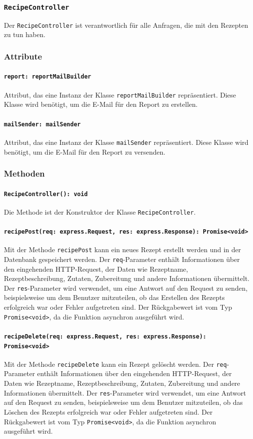 \documentclass{entwurfsheft}
\begin{document}
\subsubsection{\texttt{RecipeController}}\label{sec:RecipeController}
Der \texttt{RecipeController} ist verantwortlich für alle Anfragen, die mit den Rezepten zu tun haben.
\subsubsection*{Attribute}
\paragraph{\texttt{report: reportMailBuilder}}
Attribut, das eine Instanz der Klasse \texttt{reportMailBuilder} repräsentiert. Diese Klasse wird benötigt, um die E-Mail für den Report zu erstellen.
\paragraph{\texttt{mailSender: mailSender}}
Attribut, das eine Instanz der Klasse \texttt{mailSender} repräsentiert. Diese Klasse wird benötigt, um die E-Mail für den Report zu versenden.
\subsubsection*{Methoden}
\paragraph{\texttt{RecipeController(): void}}
Die Methode ist der Konstruktor der Klasse \texttt{RecipeController}.
\paragraph{\texttt{recipePost(req: express.Request, res: express.Response): Promise<void>}}
Mit der Methode \texttt{recipePost} kann ein neues Rezept erstellt werden und in der Datenbank gespeichert werden. Der \texttt{req}-Parameter enthält Informationen über den eingehenden HTTP-Request, der Daten wie Rezeptname, Rezeptbeschreibung, Zutaten, Zubereitung und andere Informationen übermittelt. Der \texttt{res}-Parameter wird verwendet, um eine Antwort auf den Request zu senden, beispielsweise um dem Benutzer mitzuteilen, ob das Erstellen des Rezepts erfolgreich war oder Fehler aufgetreten sind.
Der Rückgabewert ist vom Typ \texttt{Promise<void>}, da die Funktion asynchron ausgeführt wird.
\paragraph{\texttt{recipeDelete(req: express.Request, res: express.Response): Promise<void>}}
Mit der Methode \texttt{recipeDelete} kann ein Rezept gelöscht werden. Der \texttt{req}-Parameter enthält Informationen über den eingehenden HTTP-Request, der Daten wie Rezeptname, Rezeptbeschreibung, Zutaten, Zubereitung und andere Informationen übermittelt. Der \texttt{res}-Parameter wird verwendet, um eine Antwort auf den Request zu senden, beispielsweise um dem Benutzer mitzuteilen, ob das Löschen des Rezepts erfolgreich war oder Fehler aufgetreten sind.
Der Rückgabewert ist vom Typ \texttt{Promise<void>}, da die Funktion asynchron ausgeführt wird.
\end{document}
